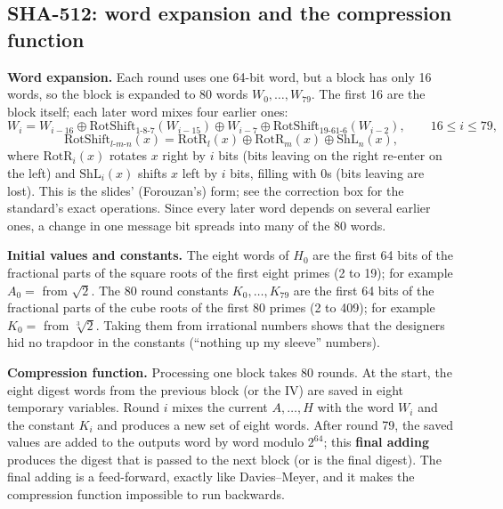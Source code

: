 \subsection{SHA-512: word expansion and the compression function \new}

\textbf{Word expansion.} Each round uses one 64-bit word, but a block has only 16 words, so the block is expanded to 80 words $W_0, \dots, W_{79}$. The first 16 are the block itself; each later word mixes four earlier ones:
\[
W_i = W_{i-16} \oplus \mathrm{RotShift}_{1\text{-}8\text{-}7}(W_{i-15}) \oplus W_{i-7} \oplus \mathrm{RotShift}_{19\text{-}61\text{-}6}(W_{i-2}), \qquad 16 \le i \le 79,
\]
\[
\mathrm{RotShift}_{l\text{-}m\text{-}n}(x) = \mathrm{RotR}_l(x) \oplus \mathrm{RotR}_m(x) \oplus \mathrm{ShL}_n(x),
\]
where $\mathrm{RotR}_i(x)$ rotates $x$ right by $i$ bits (bits leaving on the right re-enter on the left) and $\mathrm{ShL}_i(x)$ shifts $x$ left by $i$ bits, filling with 0s (bits leaving are lost). This is the slides' (Forouzan's) form; see the correction box for the standard's exact operations. Since every later word depends on several earlier ones, a change in one message bit spreads into many of the 80 words.

\textbf{Initial values and constants.} The eight words of $H_0$ are the first 64 bits of the fractional parts of the square roots of the first eight primes (2 to 19); for example $A_0 = $  from $\sqrt 2$. The 80 round constants $K_0, \dots, K_{79}$ are the first 64 bits of the fractional parts of the cube roots of the first 80 primes (2 to 409); for example $K_0 = $  from $\sqrt[3]{2}$. Taking them from irrational numbers shows that the designers hid no trapdoor in the constants (``nothing up my sleeve'' numbers).

\textbf{Compression function.} Processing one block takes 80 rounds. At the start, the eight digest words from the previous block (or the IV) are saved in eight temporary variables. Round $i$ mixes the current $A, \dots, H$ with the word $W_i$ and the constant $K_i$ and produces a new set of eight words. After round 79, the saved values are added to the outputs word by word modulo $2^{64}$; this \textbf{final adding} produces the digest that is passed to the next block (or is the final digest). The final adding is a feed-forward, exactly like Davies--Meyer, and it makes the compression function impossible to run backwards.

